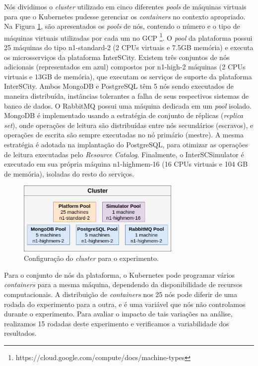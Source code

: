 Nós dividimos o \textit{cluster} utilizado em cinco diferentes \textit{pools} de máquinas virtuais para que o Kubernetes pudesse gerenciar os \textit{containers} no contexto apropriado.
Na Figura \ref{fig:node-pools}, são apresentados os \textit{pools} de nós, contendo o número e o tipo de máquinas virtuais utilizadas por cada um no GCP
\footnote{https://cloud.google.com/compute/docs/machine-types}.
O \textit{pool} da plataforma possui 25 máquinas do tipo n1-standard-2 (2 CPUs virtuais e 7.5GB memória) e executa os microsserviços da plataforma InterSCity.
Existem três conjuntos de nós adicionais (representados em azul) compostos por n1-high-2 máquinas (2 CPUs virtuais e 13GB de memória), que executam os serviços de suporte da plataforma InterSCity.
Ambos MongoDB e PostgreSQL têm 5 nós sendo executados de maneira distribuída, instâncias tolerantes a falha de seus respectivos sistemas de banco de dados.
O RabbitMQ possui uma máquina dedicada em um \textit{pool} isolado.
MongoDB é implementado usando a estratégia de conjunto de réplicas (\textit{replica set}), onde operações de leitura são distribuídas entre nós secundários (escravos), e operações de escrita são
sempre executadas no nó primário (mestre).
A mesma estratégia é adotada na implantação do PostgreSQL, para otimizar as operações de leitura executadas pelo \textit{Resource Catalog}.
Finalmente, o InterSCSimulator é executado em sua própria máquina n1-highmem-16 (16 CPUs virtuais e 104 GB de memória), isoladas do resto do serviços.

\begin{figure}[ht]
	\centering
	\includegraphics[width=0.7\textwidth]{figuras/node-pools.png}
    \caption{Configuração do \textit{cluster} para o experimento.}
	\label{fig:node-pools}
\end{figure}


Para o conjunto de nós da plataforma, o Kubernetes pode programar vários \textit{containers} para a mesma máquina, dependendo da disponibilidade de recursos computacionais.
A distribuição de \textit{containers} nos 25 nós pode diferir de uma rodada do experimento para a outra, e é uma variável que nós não controlamos durante o experimento.
Para avaliar o impacto de tais variações na análise, realizamos 15 rodadas deste experimento e verificamos a variabilidade dos resultados.

